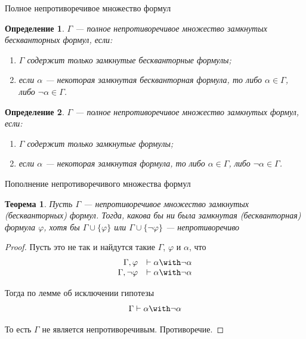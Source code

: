 \documentclass[aspectratio=169]{beamer}
\newtheorem{thm}{Теорема}[section]
\newtheorem{dfn}{Определение}[section]
\begin{document}
\begin{frame}{Полное непротиворечивое множество формул}
\begin{dfn}$\Gamma$ --- \emph{полное} непротиворечивое множество замкнутых бескванторных формул,
если:
\begin{enumerate}\item $\Gamma$ содержит только замкнутые бескванторные формулы;
\item если $\alpha$ --- некоторая замкнутая бескванторная формула, то либо $\alpha\in\Gamma$, либо $\neg\alpha\in\Gamma$.
\end{enumerate}
\end{dfn}\pause

\begin{dfn}$\Gamma$ --- \emph{полное} непротиворечивое множество замкнутых формул, если:
\begin{enumerate}\item $\Gamma$ содержит только замкнутые формулы;
\item если $\alpha$ --- некоторая замкнутая формула, то либо $\alpha \in \Gamma$, либо $\neg\alpha \in \Gamma$.
\end{enumerate}
\end{dfn}
\end{frame}

\begin{frame}{Пополнение непротиворечивого множества формул}
\begin{thm}Пусть $\Gamma$ --- непротиворечивое множество замкнутых (бескванторных) формул. Тогда, какова бы ни была
замкнутая (бескванторная) формула $\varphi$, хотя бы $\Gamma \cup \{\varphi\}$ или $\Gamma \cup \{\neg\varphi\}$ ---
непротиворечиво\end{thm}\pause

\begin{proof}
Пусть это не так и найдутся такие $\Gamma$, $\varphi$ и $\alpha$, что
 $$\begin{array}{rl}\Gamma,\varphi & \vdash \alpha\with\neg\alpha\\
                    \Gamma,\neg\varphi & \vdash \alpha \with\neg\alpha\end{array}$$\pause\vspace{-0.3cm}

Тогда по лемме об исключении гипотезы
$$\Gamma\vdash \alpha\with\neg\alpha$$\pause\vspace{-0.4cm}

То есть $\Gamma$ не является непротиворечивым. Противоречие.
\end{proof}
\end{frame}
\end{document}
